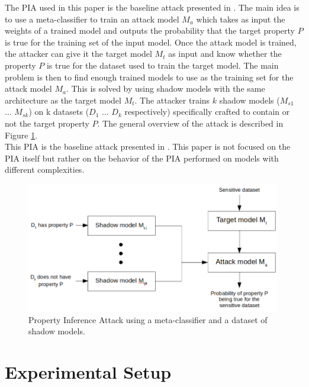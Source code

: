 \documentclass[11pt]{article}
\begin{document}
The PIA used in this paper is the baseline attack presented in \cite{Ganju2018}. The main idea is to use a meta-classifier to train an attack model $M_a$ which takes as input the weights of a trained model and outputs the probability that the target property $P$ is true for the training set of the input model. Once the attack model is trained, the attacker can give it the target model $M_t$ as input and know whether the property $P$ is true for the dataset used to train the target model. The main problem is then to find enough trained models to use as the training set for the attack model $M_a$. This is solved by using shadow models with the same architecture as the target model $M_t$. The attacker trains $k$ shadow models ($M_{s1}$ ... $M_{sk}$) on k datasets ($D_1$ ... $D_k$ respectively) specifically crafted to contain or not the target property $P$. The general overview of the attack is described in Figure \ref{pia_diagram}.\\
This PIA is the baseline attack presented in \cite{Ganju2018}. This paper is not focused on the PIA itself but rather on the behavior of the PIA performed on models with different complexities. \\ %

\begin{figure}[h]
    \centering
    \begin{minipage}{\textwidth}
        \centering
        \includegraphics[width=0.99\textwidth]{pia_diagram2.png} %
        \caption{Property Inference Attack using a meta-classifier and a dataset of shadow models.}
        \label{pia_diagram}
    \end{minipage}\hfill
\end{figure}

\section{Experimental Setup}
\end{document}
